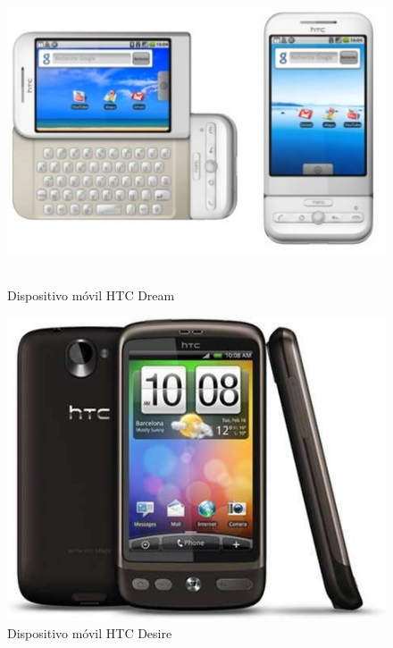 \begin{figure}[h]
	\centering	
         \includegraphics[height=90mm]{img/htc-dream.jpg}
	\caption{Dispositivo móvil HTC Dream}
\end{figure}

\begin{figure}[h]
	\centering	
         \includegraphics[height=90mm]{img/htc-desire.jpg}
	\caption{Dispositivo móvil HTC Desire}
\end{figure}


